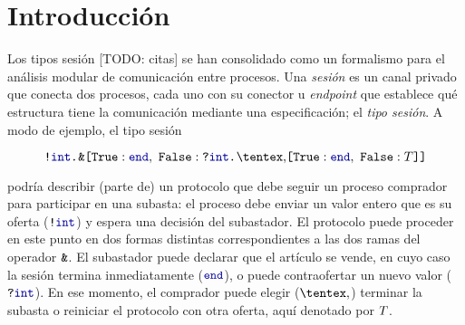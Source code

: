 \section{Introducción}

Los tipos sesión [TODO: citas] se han consolidado como un formalismo para el
análisis modular de comunicación entre procesos. Una \emph{sesión} es un canal
privado que conecta dos procesos, cada uno con su conector u \emph{endpoint} que
establece qué estructura tiene la comunicación mediante una especificación; el
\emph{tipo sesión}. A modo de ejemplo, el tipo sesión

\begin{equation}
    \label{eq:bare.auction}
    \Out\tint{
        \BinaryPBranch[]\End{
            \In\tint{
                \BinaryPChoice[]\End\T
            }
        }
    }
\end{equation}

podría describir (parte de) un protocolo que debe seguir un proceso comprador
para participar en una subasta: el proceso debe enviar un valor entero que es su
oferta ($ \Out [] \tint $) y espera una decisión del subastador. El protocolo
puede proceder en este punto en dos formas distintas correspondientes a las dos
ramas del operador $\texttt{\upshape\&}$. El subastador puede declarar que el
artículo se vende, en cuyo caso la sesión termina inmediatamente ($ \End $), o
puede contraofertar un nuevo valor ($ \In [] \tint $). En ese momento, el
comprador puede elegir ($\Choice$) terminar la subasta o reiniciar
el protocolo con otra oferta, aquí denotado por $T$.
